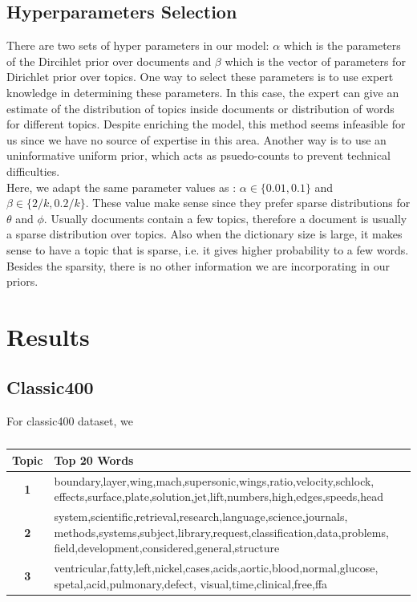 \documentclass[twoside,12pt]{article}
\begin{document}
\subsection{Hyperparameters Selection}
There are two sets of hyper parameters in our model: $\alpha$ which is the parameters of the Dircihlet prior over documents and $\beta$ which is the vector of parameters for Dirichlet prior over topics. One way to select these parameters is to use expert knowledge in determining these parameters. In this case, the expert can give an estimate of the distribution of topics inside documents or distribution of words for different topics. Despite enriching the model, this method seems infeasible for us since we have no source of expertise in this area. Another way is to use an uninformative uniform prior, which acts as psuedo-counts to prevent technical difficulties.\\
Here, we adapt the same parameter values as \cite{fastlda}: $\alpha \in \{0.01,0.1\}$ and $\beta\in\{2/k,0.2/k\}$. These value make sense since they prefer sparse distributions for $\theta$ and $\phi$. Usually documents contain a few topics, therefore a document is usually a sparse distribution over topics. Also when the dictionary size is large, it makes sense to have a topic that is sparse, i.e. it gives higher probability to a few words. Besides the sparsity, there is no other information we are incorporating in our priors. 

\section{Results}


\subsection{Classic400}
For classic400 dataset, we 


\begin{table}[!]
\begin{center}
\begin{tabular}{| c | p{12cm} |}
\hline
\textbf{Topic}& \textbf{Top 20 Words}  \\ \hline
\textbf{1}&boundary,layer,wing,mach,supersonic,wings,ratio,velocity,schlock, effects,surface,plate,solution,jet,lift,numbers,high,edges,speeds,head\\ \hline
\textbf{2}&system,scientific,retrieval,research,language,science,journals, methods,systems,subject,library,request,classification,data,problems, field,development,considered,general,structure\\
 \hline
\textbf{3}&ventricular,fatty,left,nickel,cases,acids,aortic,blood,normal,glucose, spetal,acid,pulmonary,defect, visual,time,clinical,free,ffa\\
 \hline
 
\end{tabular}
\caption{}
\label{table:2}
\end{center}
\end{table}
\end{document}

